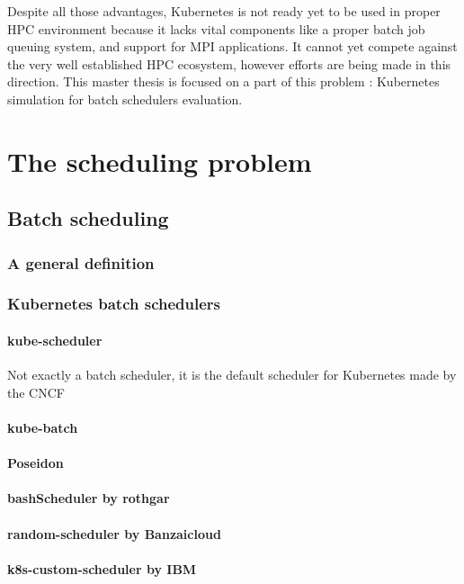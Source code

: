 \documentclass[12pt]{report}
\begin{document}
Despite all those advantages, Kubernetes is not ready yet to be used
in proper HPC environment because it lacks vital components like a proper batch
job queuing system, and support for MPI applications. It cannot yet compete
against the very well established HPC ecosystem, however efforts are being made
in this direction. This master thesis is focused on a part of this problem :
Kubernetes simulation for batch schedulers evaluation.

\chapter{The scheduling problem}

\section{Batch scheduling}

\subsection{A general definition}

\subsection{Kubernetes batch schedulers}
\subsubsection{kube-scheduler}
Not exactly a batch scheduler, it is the default scheduler for Kubernetes made
by the CNCF

\subsubsection{kube-batch}
\subsubsection{Poseidon}
\subsubsection{bashScheduler by rothgar}
\subsubsection{random-scheduler by Banzaicloud}
\subsubsection{k8s-custom-scheduler by IBM}
\end{document}
